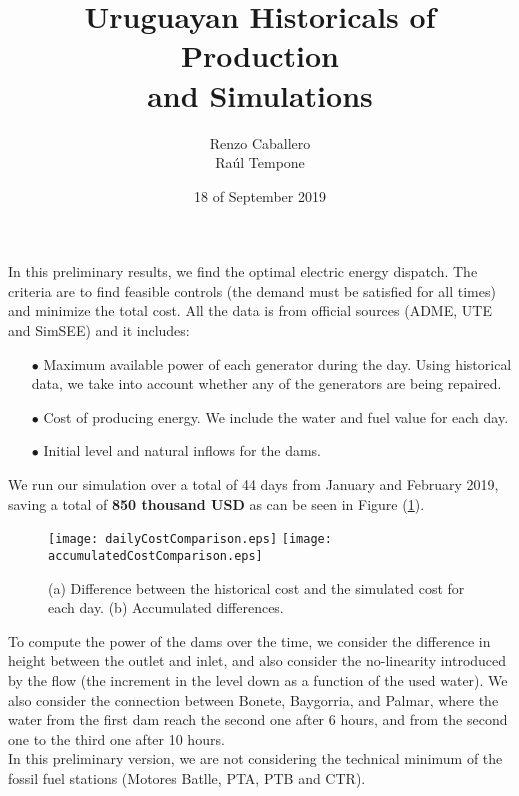 \documentclass[12pt]{article}
\theoremstyle{definition}
\theoremstyle{remark}
\begin{document}
\title{Uruguayan Historicals of Production\\
and Simulations}
\author{Renzo Caballero\\
Ra\'ul Tempone} 
\date{18 of September 2019}
\maketitle

In this preliminary results, we find the optimal electric energy dispatch. The criteria are to find feasible controls (the demand must be satisfied for all times) and minimize the total cost. All the data is from official sources (ADME, UTE and SimSEE) and it includes:
\begin{enumerate}

\item[$\bullet$] Maximum available power of each generator during the day. Using historical data, we take into account whether any of the generators are being repaired.

\item[$\bullet$] Cost of producing energy. We include the water and fuel value for each day.

\item[$\bullet$] Initial level and natural inflows for the dams.

\end{enumerate}
We run our simulation over a total of 44 days from January and February 2019, saving a total of \textbf{850 thousand USD} as can be seen in Figure (\ref{F1}).

\begin{figure}[ht!]
\centering
\subfigure
{\texttt{[image: dailyCostComparison.eps]}}\quad
{\texttt{[image: accumulatedCostComparison.eps]}}
\caption{(a) Difference between the historical cost and the simulated cost for each day. (b) Accumulated differences.}
\label{F1}
\end{figure}

To compute the power of the dams over the time, we consider the difference in height between the outlet and inlet, and also consider the no-linearity introduced by the flow (the increment in the level down as a function of the used water). We also consider the connection between Bonete, Baygorria, and Palmar, where the water from the first dam reach the second one after 6 hours, and from the second one to the third one after 10 hours.\\
In this preliminary version, we are not considering the technical minimum of the fossil fuel stations (Motores Batlle, PTA, PTB and CTR).
\end{document}
